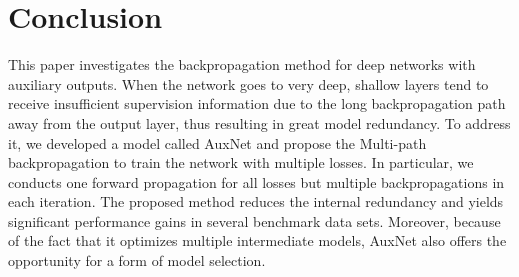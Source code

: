\documentclass[10pt,onecolumn,letterpaper]{article}
\def\SexyName{AuxNet\xspace}
\begin{document}
\section{Conclusion}
This paper investigates the backpropagation method for deep networks with auxiliary outputs. When the network goes to very deep, shallow layers tend to receive insufficient supervision information due to the long backpropagation path away from the output layer, thus resulting in great model redundancy. To address it, we developed a model called \SexyName and propose the Multi-path backpropagation to train the network with multiple losses. In particular, we conducts one forward propagation for all losses but multiple backpropagations in each iteration. The proposed method reduces the internal redundancy and yields significant performance gains in several benchmark data sets. Moreover, because of the fact that it optimizes multiple intermediate models, \SexyName also offers the opportunity for a form of model selection.

\clearpage
\small

\end{document}
